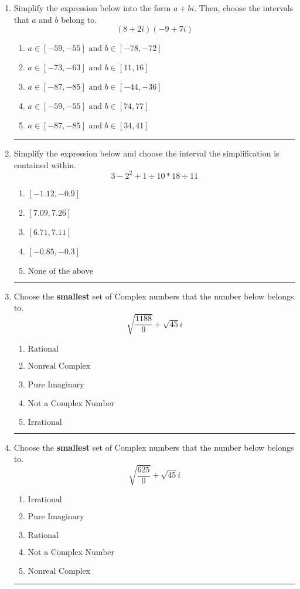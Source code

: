 \documentclass[14pt]{extbook}
\newcommand{\litem}[1]{\item#1\hspace*{-1cm}\rule{\textwidth}{0.4pt}}
\begin{document}
\begin{enumerate}
\litem{
Simplify the expression below into the form $a+bi$. Then, choose the intervals that $a$ and $b$ belong to.\[ (8 + 2 i)(-9 + 7 i) \]\begin{enumerate}[label=\Alph*.]
\item \( a \in [-59, -55] \text{ and } b \in [-78, -72] \)
\item \( a \in [-73, -63] \text{ and } b \in [11, 16] \)
\item \( a \in [-87, -85] \text{ and } b \in [-44, -36] \)
\item \( a \in [-59, -55] \text{ and } b \in [74, 77] \)
\item \( a \in [-87, -85] \text{ and } b \in [34, 41] \)

\end{enumerate} }
\litem{
Simplify the expression below and choose the interval the simplification is contained within.\[ 3 - 2^2 + 1 \div 10 * 18 \div 11 \]\begin{enumerate}[label=\Alph*.]
\item \( [-1.12, -0.9] \)
\item \( [7.09, 7.26] \)
\item \( [6.71, 7.11] \)
\item \( [-0.85, -0.3] \)
\item \( \text{None of the above} \)

\end{enumerate} }
\litem{
Choose the \textbf{smallest} set of Complex numbers that the number below belongs to.\[ \sqrt{\frac{1188}{9}}+\sqrt{45} i \]\begin{enumerate}[label=\Alph*.]
\item \( \text{Rational} \)
\item \( \text{Nonreal Complex} \)
\item \( \text{Pure Imaginary} \)
\item \( \text{Not a Complex Number} \)
\item \( \text{Irrational} \)

\end{enumerate} }
\litem{
Choose the \textbf{smallest} set of Complex numbers that the number below belongs to.\[ \sqrt{\frac{625}{0}}+\sqrt{45} i \]\begin{enumerate}[label=\Alph*.]
\item \( \text{Irrational} \)
\item \( \text{Pure Imaginary} \)
\item \( \text{Rational} \)
\item \( \text{Not a Complex Number} \)
\item \( \text{Nonreal Complex} \)


\end{enumerate}}
\end{enumerate}
\end{document}
